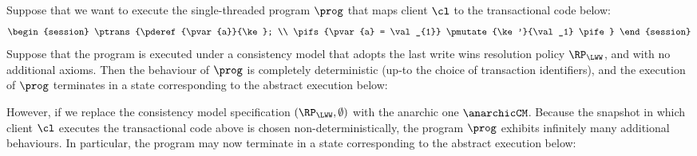 \begin{example}
Suppose that we want to execute the single-threaded program $\prog$ that maps client 
$\cl$ to the transactional code below:
\[
\begin{session}
\ptrans{\pderef{\pvar{a}}{\ke}; \\
\pifs{\pvar{a} = \val_{1}} \pmutate{\ke'}{\val_1} \pife}
\end{session}
\]
Suppose that the program is executed under a consistency model that adopts the last write 
wins resolution policy $\RP_{\LWW}$, and with no additional axioms. Then the behaviour of $\prog$ is 
completely deterministic (up-to the choice of transaction identifiers), and the execution of $\prog$ terminates in a 
state corresponding to the abstract execution below: 

\begin{center}
\end{center}

However, if we replace the consistency model specification $(\RP_{\LWW}, \emptyset)$ with the 
anarchic one $\anarchicCM$. Because the snapshot in which client $\cl$ executes the 
transactional code above is chosen non-deterministically, 
the program $\prog$ exhibits infinitely many additional behaviours. 
In particular, the program may now terminate in a state corresponding 
to the abstract execution below: 


\end{example}
